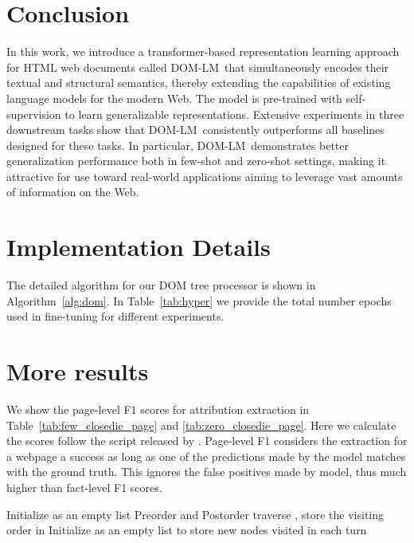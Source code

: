\documentclass[sigconf, nonacm]{acmart}
\newcommand{\ours}[0]{DOM-LM}
\newcommand{\nop}[1]{}
\begin{document}
 \section{Conclusion}
In this work, we introduce a transformer-based representation learning approach for HTML web documents called \ours \ that simultaneously encodes their textual and structural semantics, thereby extending the capabilities of existing language models for the modern Web. The model is pre-trained with self-supervision to learn generalizable representations. Extensive experiments in three downstream tasks show that \ours \  consistently outperforms all baselines designed for these tasks. In particular, \ours \ demonstrates better generalization performance both in few-shot and zero-shot settings, making it attractive for use toward real-world applications aiming to leverage vast amounts of information on the Web. 






\clearpage
\appendix
\section{Implementation Details}
\label{app:detail}
The detailed algorithm for our DOM tree processor is shown in Algorithm~\ref{alg:dom}. In Table~\ref{tab:hyper} we provide the total number epochs used in fine-tuning for different experiments.
\section{More results}
\label{app:more_results}
We show the page-level F1 scores for attribution extraction in Table~\ref{tab:few_closedie_page} and \ref{tab:zero_closedie_page}. Here we calculate the scores follow the script released by \citet{zhou2021simplified}. Page-level F1 considers the extraction for a webpage a success as long as one of the predictions made by the model matches with the ground truth. This ignores the false positives made by model, thus much higher than fact-level F1 scores.

\begin{algorithm}[t]
\nop{Put comments for major snippets; otherwise can be hard to parse.}
\caption{DOM tree Processor to generate subtrees.}\label{alg:dom}
Initialize  as an empty list\;
Preorder and Postorder traverse , store the visiting order in \;
Initialize  as an empty list to store new nodes visited in each turn\;
\end{algorithm}
\end{document}
